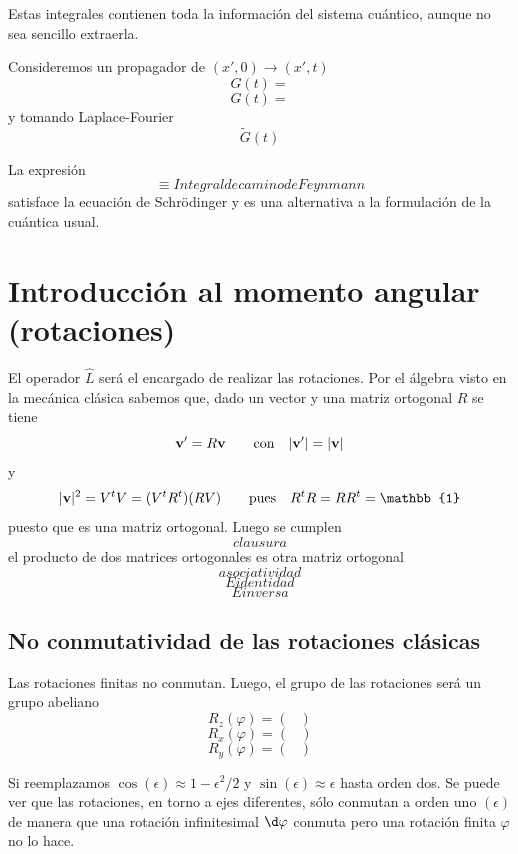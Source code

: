 \documentclass[10pt,oneside]{CBFT_book}
\begin{document}
Estas integrales contienen toda la información del sistema cuántico, aunque no sea sencillo extraerla.

Consideremos un propagador de $(x',0) \to (x',t)$
\[
	G(t) =
\]
\[
	G(t) =
\]
y tomando Laplace-Fourier 
\[
	\tilde{G}(t)
\]

La expresión 
\[
	\equiv Integral de camino de Feynmann
\]
satisface la ecuación de Schrödinger y es una alternativa a la formulación de la cuántica usual.

\section{Introducción al momento angular (rotaciones)}

El operador $\hat{L}$ será el encargado de realizar las rotaciones. Por el álgebra visto en la mecánica 
clásica sabemos que, dado un vector  y una matriz ortogonal $R$ se tiene
\[
	\vb{v}' = R \vb{v} \qquad \text{con} \quad |\vb{v}'|=|\vb{v}|
\]
y 
\[
	|\vb{v}|^2 = V^t V = (V^t R^t) (R V) \qquad \text{pues} \quad R^tR=RR^t = \mathbb{1}
\]
puesto que es una matriz ortogonal. Luego se cumplen 
\[
	clausura	
\]
el producto de dos matrices ortogonales es otra matriz ortogonal
\[
	asociatividad
\]
\[
	E identidad
\]
\[
	E inversa
\]

\subsection{No conmutatividad de las rotaciones clásicas}

Las rotaciones finitas no conmutan. Luego, el grupo de las rotaciones será un grupo abeliano
\[
	R_z(\varphi) = \begin{pmatrix}
	 \\
	\end{pmatrix}
\]
\[
	R_x(\varphi) = \begin{pmatrix}
	 \\
	\end{pmatrix}
\]
\[
	R_y(\varphi) = \begin{pmatrix}
	 \\
	\end{pmatrix}
\]

Si reemplazamos $\cos(\epsilon) \approx 1 - \epsilon^2/2$ y $\sin(\epsilon) \approx \epsilon$ hasta orden dos.
Se puede ver que las rotaciones, en torno a ejes diferentes, sólo conmutan a orden uno $(\epsilon)$ de manera 
que una rotación infinitesimal $\d\varphi$ conmuta pero una rotación finita $\varphi$ no lo hace.
\end{document}
